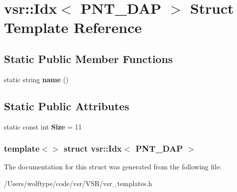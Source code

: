 \hypertarget{structvsr_1_1_idx_3_01_p_n_t___d_a_p_01_4}{\section{vsr\-:\-:Idx$<$ P\-N\-T\-\_\-\-D\-A\-P $>$ Struct Template Reference}
\label{structvsr_1_1_idx_3_01_p_n_t___d_a_p_01_4}
}
\subsection*{Static Public Member Functions}
\begin{DoxyCompactItemize}
\item 
\hypertarget{structvsr_1_1_idx_3_01_p_n_t___d_a_p_01_4_a907389ee35ff527f1e86e4457f4ba2cc}{static string {\bfseries name} ()}\label{structvsr_1_1_idx_3_01_p_n_t___d_a_p_01_4_a907389ee35ff527f1e86e4457f4ba2cc}

\end{DoxyCompactItemize}
\subsection*{Static Public Attributes}
\begin{DoxyCompactItemize}
\item 
\hypertarget{structvsr_1_1_idx_3_01_p_n_t___d_a_p_01_4_a51ba8b8846a4743af30b40727c306889}{static const int {\bfseries Size} = 11}\label{structvsr_1_1_idx_3_01_p_n_t___d_a_p_01_4_a51ba8b8846a4743af30b40727c306889}

\end{DoxyCompactItemize}
\subsubsection*{template$<$$>$ struct vsr\-::\-Idx$<$ P\-N\-T\-\_\-\-D\-A\-P $>$}



The documentation for this struct was generated from the following file\-:\begin{DoxyCompactItemize}
\item 
/\-Users/wolftype/code/vsr/\-V\-S\-R/vsr\-\_\-templates.\-h\end{DoxyCompactItemize}
